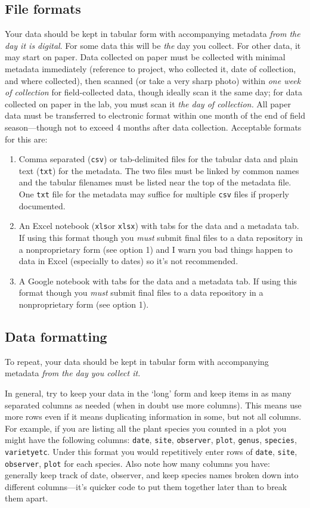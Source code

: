 \documentclass[11pt,a4paper,oneside]{article}
\begin{document}
\subsection{File formats}
Your data should be kept in tabular form with accompanying metadata \emph{from the day it is digital}. For some data this will be \emph{the} day you collect. For other data, it may start on paper. Data collected on paper must be collected with minimal metadata immediately (reference to project, who collected it, date of collection, and where collected), then scanned (or take a very sharp photo) within \emph{one week of collection} for field-collected data, though ideally scan it the same day; for data collected on paper in the lab, you must scan it \emph{the day of collection.}  All paper data must be transferred to electronic format within one month of the end of field season---though not to exceed 4 months after data collection. Acceptable formats for this are:
\begin{enumerate}
\item Comma separated (\verb|csv|) or tab-delimited files for the tabular data and plain text (\verb|txt|) for the metadata. The two files must be linked by common names and the tabular filenames must be listed near the top of the metadata file. One \verb|txt| file for the metadata may suffice for multiple \verb|csv| files if properly documented.
\item An Excel notebook (\verb|xls|or \verb|xlsx|) with tabs for the data and a metadata tab. If using this format though you \emph{must} submit final files to a data repository in a nonproprietary form (see option 1) and I warn you bad things happen to data in Excel (especially to dates) so it's not recommended.
\item A Google notebook with tabs for the data and a metadata tab. If using this format though you \emph{must} submit final files to a data repository in a nonproprietary form (see option 1).
\end{enumerate}

\subsection{Data formatting}
To repeat, your data should be kept in tabular form with accompanying metadata \emph{from the day you collect it.} 

In general, try to keep your data in the `long' form and keep items in as many separated columns as needed (when in doubt use more columns). This means use more rows even if it means duplicating information in some, but not all columns. For example, if you are listing all the plant species you counted in a plot you might have the following columns: \verb|date|, \verb|site|, \verb|observer|, \verb|plot|, \verb|genus|, \verb|species|, \verb|varietyetc|. Under this format you would repetitively enter rows of \verb|date|, \verb|site|, \verb|observer|, \verb|plot| for each species. Also note how many columns you have: generally keep track of date, observer, and keep species names broken down into different columns---it's quicker code to put them together later than to break them apart. 
\end{document}
